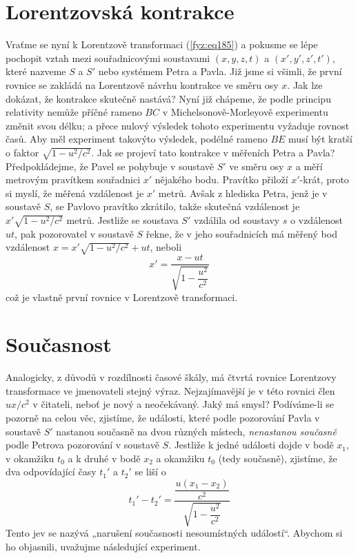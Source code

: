   \section{Lorentzovská kontrakce}\label{fyz:IchapXVsecVII}
    Vraťme se nyní k Lorentzově transformaci (\ref{fyz:eq185}) a pokusme se lépe pochopit vztah 
    mezi souřadnicovými soustavami \((x,y, z, t)\) a \((x', y', z', t')\), které nazveme \(S\) a 
    \(S'\) nebo systémem Petra a Pavla. Již jsme si všimli, že první rovnice se zakládá na 
    Lorentzově návrhu kontrakce ve směru osy \(x\). Jak lze dokázat, že kontrakce skutečně nastává? 
    Nyní již chápeme, že podle principu relativity nemůže příčné rameno \(BC\) v 
    Michelsonově-Morleyově experimentu změnit svou délku; a přece nulový výsledek tohoto 
    experimentu vyžaduje rovnost časů. Aby měl experiment takovýto výsledek, podélné rameno \(BE\) 
    musí být kratší o faktor \(\sqrt{1 - u^2/c^2}\). Jak se projeví tato kontrakce v měřeních Petra 
    a Pavla? Předpokládejme, že Pavel se pohybuje v soustavě \(S'\) ve směru osy \(x\) a měří 
    metrovým pravítkem souřadnici \(x'\) nějakého bodu. Pravítko přiloží \(x'\)-krát, proto si 
    myslí, že měřená vzdálenost je \(x'\) metrů. Avšak z hlediska Petra, jenž je v soustavě \(S\), 
    se Pavlovo pravítko zkrátilo, takže skutečná vzdálenost je \(x'\sqrt{1 - u^2/c^2}\) metrů. 
    Jestliže se soustava \(S'\) vzdálila od soustavy \(s\) o vzdálenost \(ut\), pak pozorovatel v 
    soustavě \(S\) řekne, že v jeho souřadnicích má měřený bod vzdálenost \(x = x'\sqrt{1 - 
    u^2/c^2} + ut\), neboli
    \begin{equation*}
      x'= \frac{x-ut}{\sqrt{1 - \dfrac{u^2}{c^2}}}
    \end{equation*}
    což je vlastně první rovnice v Lorentzově transformaci.
    
  \section{Současnost}\label{fyz:IchapXVsecVIII}
    Analogicky, z důvodů v rozdílnosti časové škály, má čtvrtá rovnice Lorentzovy transformace ve 
    jmenovateli stejný výraz. Nejzajímavější je v této rovnici člen \(ux/c^2\) v čitateli, neboť je 
    nový a neočekávaný. Jaký má smysl? Podíváme-li se pozorně na celou věc, zjistíme, že události, 
    které podle pozorování Pavla v soustavě \(S'\) nastanou současně na dvou různých místech, 
    \emph{nenastanou současně} podle Petrova pozorování v soustavě \(S\). Jestliže k jedné události 
    dojde v bodě \(x_1\), v okamžiku \(t_0\) a k druhé v bodě \(x_2\) a okamžiku \(t_0\) (tedy 
    současně), zjistíme, že dva odpovídající časy \(t_1'\) a \(t_2'\) se liší o
    \begin{equation*}
      t_1' - t_2'= \dfrac{\dfrac{u(x_1 - x_2)}{c^2}}{\sqrt{1 - \dfrac{u^2}{c^2}}}
    \end{equation*}
    Tento jev se nazývá „narušení současnosti nesoumístných událostí“. Abychom si ho objasnili, 
    uvažujme následující experiment.
    
